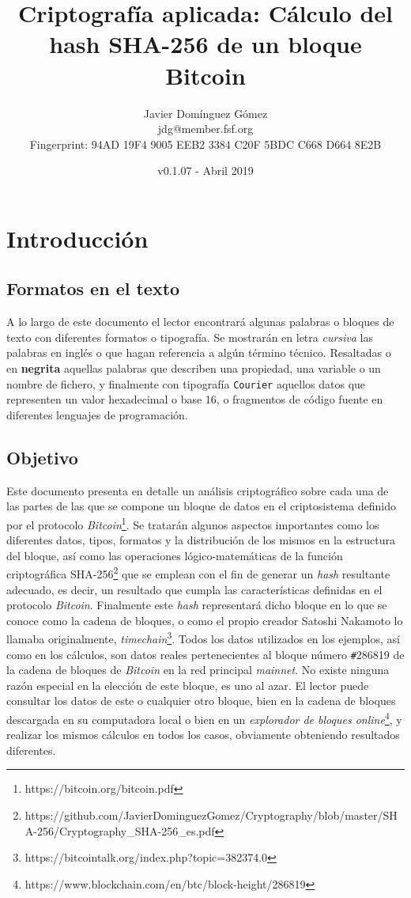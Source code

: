 \documentclass{article}
\title{\textbf{Criptografía aplicada: Cálculo del hash SHA-256 de un bloque Bitcoin}}
\author{Javier Domínguez Gómez \\
\small{jdg@member.fsf.org} \\
\small{Fingerprint: 94AD 19F4 9005 EEB2 3384 C20F 5BDC C668 D664 8E2B}}
\date{v0.1.07 - Abril 2019}
\begin{document}
\maketitle

\tableofcontents{}

\vspace{19mm}

\section{Introducción}
    \subsection{Formatos en el texto}
    A lo largo de este documento el lector encontrará algunas palabras o bloques de texto con diferentes formatos o tipografía. Se mostrarán en letra \textit{cursiva} las palabras en inglés o que hagan referencia a algún término técnico. Resaltadas o en \textbf{negrita} aquellas palabras que describen una propiedad, una variable o un nombre de fichero, y finalmente con tipografía \texttt{Courier} aquellos datos que representen un valor hexadecimal o base 16, o fragmentos de código fuente en diferentes lenguajes de programación.
    
    \subsection{Objetivo}
    Este documento presenta en detalle un análisis criptográfico sobre cada una de las partes de las que se compone un bloque de datos en el criptosistema definido por el protocolo \textit{Bitcoin}\footnote{https://bitcoin.org/bitcoin.pdf}. Se tratarán algunos aspectos importantes como los diferentes datos, tipos, formatos y la distribución de los mismos en la estructura del bloque, así como las operaciones lógico-matemáticas de la función criptográfica SHA-256\footnote{https://github.com/JavierDominguezGomez/Cryptography/blob/master/SHA-256/Cryptography\_SHA-256\_es.pdf} que se emplean con el fin de generar un \textit{hash} resultante adecuado, es decir, un resultado que cumpla las características definidas en el protocolo \textit{Bitcoin}. Finalmente este \textit{hash} representará dicho bloque en lo que se conoce como la cadena de bloques, o como el propio creador Satoshi Nakamoto lo llamaba originalmente, \textit{timechain}\footnote{https://bitcointalk.org/index.php?topic=382374.0}. Todos los datos utilizados en los ejemplos, así como en los cálculos, son datos reales pertenecientes al bloque número \texttt{\#}286819 de la cadena de bloques de \textit{Bitcoin} en la red principal \textit{mainnet}. No existe ninguna razón especial en la elección de este bloque, es uno al azar. El lector puede consultar los datos de este o cualquier otro bloque, bien en la cadena de bloques descargada en su computadora local o bien en un \textit{explorador de bloques online}\footnote{https://www.blockchain.com/en/btc/block-height/286819}, y realizar los mismos cálculos en todos los casos, obviamente obteniendo resultados diferentes.
    
\end{document}
